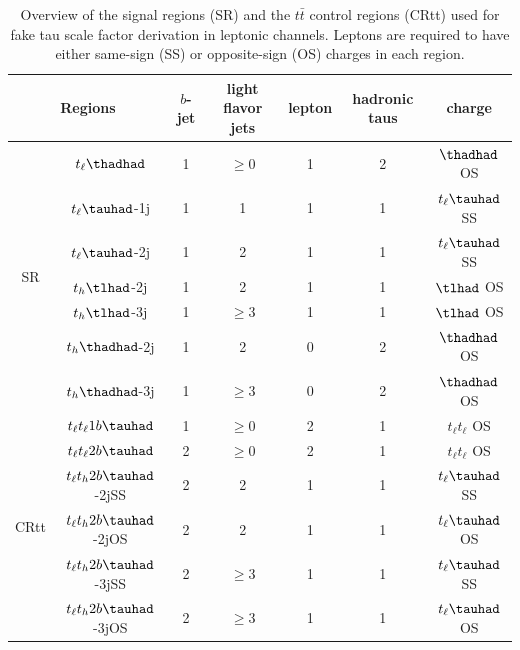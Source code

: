\begin{table}
\centering
\caption{Overview of the signal regions (SR) and the $t\bar{t}$ control regions (CRtt) used for fake tau scale factor derivation in leptonic channels. Leptons are required to have either same-sign (SS) or opposite-sign (OS) charges in each region.}
\label{tab:srcr}
\begin{tabular}[h]{c|c|c|c|c|c|c}
\hline \hline
\multicolumn{2}{c|}{Regions} & $b$-jet & light flavor jets        & lepton & hadronic taus & charge\\ \hline
\multirow{7}{*}{SR}&$t_{\ell}\thadhad$     & 1     & $\ge0$                                & 1      & 2             & $\thadhad$ OS\\ \cline{2-7}
&$t_{\ell}\tauhad$-1j  & 1     & 1                                   & 1      & 1                     & $t_{\ell}\tauhad$ SS\\ \cline{2-7}
&$t_{\ell}\tauhad$-2j  & 1     & 2                                        & 1      & 1                     & $t_{\ell}\tauhad$ SS\\ \cline{2-7}
&$t_h\tlhad$-2j   & 1     & 2                           & 1      & 1             & $\tlhad$ OS\\ \cline{2-7}
&$t_h\tlhad$-3j   & 1     & $\ge3$                      & 1      & 1             & $\tlhad$ OS\\ \cline{2-7}
&$t_h\thadhad$-2j & 1     & 2                            & 0      & 2             & $\thadhad$ OS\\ \cline{2-7}
&$t_h\thadhad$-3j & 1     & $\ge3$                       & 0      & 2             & $\thadhad$ OS\\ \hline
\multirow{6}{*}{CRtt}&$t_{\ell}t_{\ell}1b\tauhad$ & 1     & $\ge0$                            & 2      & 1                     & $t_{\ell}t_{\ell}$ OS\\ \cline{2-7}
&$t_{\ell}t_{\ell}2b\tauhad$      & 2     & $\ge0$                            & 2      & 1                     & $t_{\ell}t_{\ell}$ OS\\ \cline{2-7}
&$t_{\ell}t_h2b\tauhad$-2jSS & 2     & 2                             & 1      & 1             & $t_{\ell}\tauhad$ SS\\ \cline{2-7}
&$t_{\ell}t_h2b\tauhad$-2jOS & 2     & 2                             & 1      & 1             & $t_{\ell}\tauhad$ OS\\ \cline{2-7}
&$t_{\ell}t_h2b\tauhad$-3jSS & 2     & $\ge3$                        & 1      & 1             & $t_{\ell}\tauhad$ SS\\ \cline{2-7}
&$t_{\ell}t_h2b\tauhad$-3jOS & 2     & $\ge3$                & 1      & 1             & $t_{\ell}\tauhad$ OS\\ \hline
\end{tabular}
\end{table}







